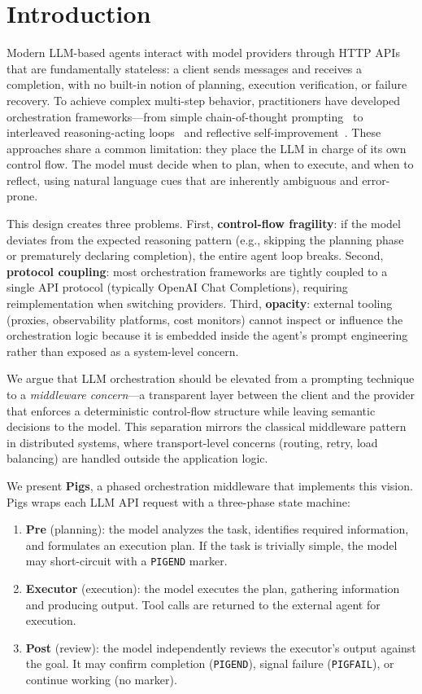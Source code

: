 \section{Introduction}
\label{sec:intro}

Modern LLM-based agents interact with model providers through HTTP APIs that are fundamentally stateless: a client sends messages and receives a completion, with no built-in notion of planning, execution verification, or failure recovery. To achieve complex multi-step behavior, practitioners have developed orchestration frameworks---from simple chain-of-thought prompting~\citep{wei2022cot} to interleaved reasoning-acting loops~\citep{yao2022react} and reflective self-improvement~\citep{shinn2023reflexion,madaan2023selfrefine}. These approaches share a common limitation: they place the LLM in charge of its own control flow. The model must decide when to plan, when to execute, and when to reflect, using natural language cues that are inherently ambiguous and error-prone.

This design creates three problems. First, \textbf{control-flow fragility}: if the model deviates from the expected reasoning pattern (e.g., skipping the planning phase or prematurely declaring completion), the entire agent loop breaks. Second, \textbf{protocol coupling}: most orchestration frameworks are tightly coupled to a single API protocol (typically OpenAI Chat Completions), requiring reimplementation when switching providers. Third, \textbf{opacity}: external tooling (proxies, observability platforms, cost monitors) cannot inspect or influence the orchestration logic because it is embedded inside the agent's prompt engineering rather than exposed as a system-level concern.

We argue that LLM orchestration should be elevated from a prompting technique to a \emph{middleware concern}---a transparent layer between the client and the provider that enforces a deterministic control-flow structure while leaving semantic decisions to the model. This separation mirrors the classical middleware pattern in distributed systems, where transport-level concerns (routing, retry, load balancing) are handled outside the application logic.

We present \textbf{Pigs}, a phased orchestration middleware that implements this vision. Pigs wraps each LLM API request with a three-phase state machine:

\begin{enumerate}[nosep]
    \item \textbf{Pre} (planning): the model analyzes the task, identifies required information, and formulates an execution plan. If the task is trivially simple, the model may short-circuit with a \texttt{PIGEND} marker.
    \item \textbf{Executor} (execution): the model executes the plan, gathering information and producing output. Tool calls are returned to the external agent for execution.
    \item \textbf{Post} (review): the model independently reviews the executor's output against the goal. It may confirm completion (\texttt{PIGEND}), signal failure (\texttt{PIGFAIL}), or continue working (no marker).
\end{enumerate}

